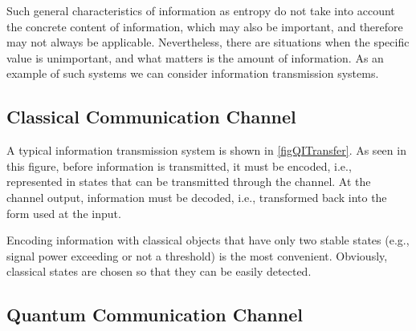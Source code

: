 Such general characteristics of information as entropy do not take into account the concrete content of information, which may also be important, and
therefore may not always be applicable. 
Nevertheless, there are situations when the specific value is unimportant,
and what matters is the amount of information. As an example of such systems we can consider information transmission systems.




\subsection{Classical Communication Channel}

A typical information transmission system is shown in
\autoref{figQITransfer}. As seen in this figure, before
information is transmitted, it must be encoded,
i.e., represented in states that can be transmitted through
the channel. At the channel output, information must be decoded,
i.e., transformed back into the form used at the input. 

Encoding information with classical
objects that have only two stable states (e.g., signal power exceeding
or not a threshold) is the most convenient. Obviously,
classical states are chosen so that they can be easily detected. 

\subsection{Quantum Communication Channel}


